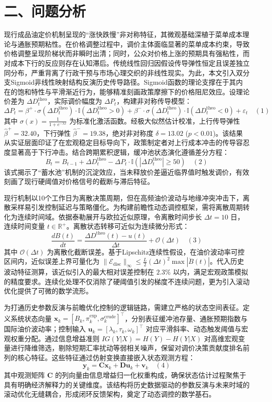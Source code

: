 \documentclass{mcmthesis}
\begin{document}
\section{ 二、问题分析}

现行成品油定价机制呈现的“涨快跌慢”非对称特征，其微观基础深植于菜单成本理论与通胀预期粘性。在价格调整过程中，调价主体面临显著的菜单成本约束，导致价格调整呈现阶梯状而非瞬时出清；同时，公众对价格上涨的预期具有强粘性，而对成本下行的反应则存在认知滞后。传统线性回归因假设传导弹性恒定且误差独立同分布，严重背离了行政干预与市场心理交织的非线性现实。为此，本文引入双分支Sigmoid非线性映射结构反演历史传导路径。Sigmoid函数的理论支撑在于其内在的饱和特性与平滑渐近行为，能够精准刻画政策摩擦下的价格阻尼效应。设理论价差为 $\Delta D_t^{\text{theo}}$，实际调价幅度为 $\Delta P_t$，构建非对称传导模型：
$$ \Delta P_t = \beta^+ \cdot \sigma(\Delta D_t^{\text{theo}}) \cdot \mathbb{I}(\Delta D_t^{\text{theo}}>0) + \beta^- \cdot \sigma(\Delta D_t^{\text{theo}}) \cdot \mathbb{I}(\Delta D_t^{\text{theo}}<0) + \varepsilon_t \quad (1) $$
其中 $\sigma(x) = \frac{1}{1+e^{-\lambda x}}$ 为标准化激活函数。经极大似然估计校准，上行传导弹性 $\hat{\beta}^+=32.40$，下行弹性 $\hat{\beta}^-=19.38$，绝对非对称度 $\delta = 13.02$ ($p<0.01$)。该结果从实证层面印证了在宏观稳定目标导向下，政策制定者对上行成本冲击的传导容忍度显著高于下行冲击。结合跨期累积逻辑，缓冲池状态演化遵循差分方程：
$$ B_t = B_{t-1} + \Delta D_t^{\text{theo}} - \Delta P_t \cdot \mathbb{I}(|\Delta D_t^{\text{theo}}| \geq 50) \quad (2) $$
该式揭示了“蓄水池”机制的沉淀效应，当未释放价差逼近临界值时触发调价，有效刻画了现行硬阈值对价格信号的截断与滞后特征。

现行机制以10个工作日为离散决策周期，但在高频油价波动与地缘冲突冲击下，离散采样易引发控制延迟与策略僵化。为构建前瞻性动态调控框架，需将离散周期转化为连续时间域。依据泰勒展开与欧拉近似原理，令离散时间步长 $\Delta t = 10$ 日，连续时间变量 $t \in \mathbb{R}^+$。离散状态转移可近似为连续微分形式：
$$ \frac{dB(t)}{dt} = \frac{\Delta D^{\text{theo}}(t) - u(t)}{\Delta t} + \mathcal{O}(\Delta t) \quad (3) $$
其中 $\mathcal{O}(\Delta t)$ 为离散化截断误差。基于Lipschitz连续性假设，在油价波动率可控区间内，近似误差上界可量化为 $\|\mathcal{E}_{\text{disc}}\|_\infty \leq \frac{L}{2}(\Delta t)^2 \max |\ddot{B}(t)|$。代入历史波动特征测算，该近似引入的最大相对误差控制在 $2.3\%$ 以内，满足宏观政策模拟的精度要求。连续化处理不仅消除了硬阈值引发的梯度不连续问题，更为引入滚动优化提供了可微的数学流形。

为打通历史参数反演与前瞻优化控制的逻辑链路，需建立严格的状态空间表征。定义系统状态向量 $\mathbf{x}_k = [B_k, \pi_k^{\text{exp}}, \sigma_k^{\text{crude}}]^\top$，分别表征缓冲池存量、通胀预期指数与国际油价波动率；控制输入 $\mathbf{u}_k = [\lambda_k, \tau_k, \omega_k]^\top$ 对应平滑斜率、动态触发阈值与宏观权重分配。通过信息增益准则 $IG(Y|X) = H(Y) - H(Y|X)$ 对高维宏观变量进行降维筛选，剔除短期汇率扰动等弱相关噪声，保留对调价决策贡献度排名前列的核心特征。这些特征通过仿射变换直接嵌入状态观测方程：
$$ \mathbf{y}_k = \mathbf{C}\mathbf{x}_k + \mathbf{D}\mathbf{u}_k + \mathbf{v}_k \quad (4) $$
其中观测矩阵 $\mathbf{C}$ 的列向量由信息增益归一化权重构成，确保状态估计过程聚焦于具有明确经济解释力的关键维度。该结构将历史数据驱动的参数反演与未来时域的滚动优化无缝耦合，形成闭环反馈架构，奠定了动态调控的数学基石。
\end{document}
